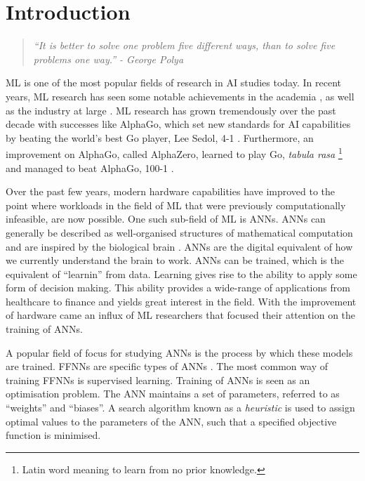 \chapter{Introduction}\label{chap:introduction}

\begin{quotation}
      \textit{``It is better to solve one problem five different ways, than to solve five problems one way.'' - George Polya}
\end{quotation}


\Ac{ML} is one of the most popular fields of research in \ac{AI} studies today.
In recent years, \ac{ML} research has seen some notable achievements in the
academia \cite{ref:lecun:2015, ref:glorot:2010, ref:goodfellow:2014,
      ref:quoc:2017}, as well as the industry at large \cite{ref:silver:2016,
      ref:silver:2017, ref:zoph:2017, ref:lewis:2017}.  \ac{ML} research has grown
tremendously over the past decade with successes like AlphaGo, which set new
standards for \ac{AI} capabilities by beating the world's best Go player, Lee
Sedol, 4-1 \cite{ref:san-hun:2016}.  Furthermore, an improvement on AlphaGo,
called AlphaZero, learned to play Go, \textit{tabula rasa} \footnote{Latin word
      meaning to learn from no prior knowledge.} and managed to beat AlphaGo, 100-1
\cite{ref:silver:2017}.

Over the past few years, modern hardware capabilities have improved to the
point where workloads in the field of \ac{ML} that were previously computationally
infeasible, are now possible. One such sub-field of \ac{ML} is \acp{ANN}. \acp{ANN} can generally be described as well-organised structures of mathematical computation and are inspired by the biological brain \cite{ref:engelbrecht:2007}. \acp{ANN} are the digital equivalent of how we currently understand the brain to work. \acp{ANN} can be trained, which is the equivalent of ``learnin'' from data. Learning gives rise to the ability to apply some form of decision making. This ability provides a wide-range of applications from healthcare to finance and yields great interest in the field. With the improvement of hardware came an influx of \ac{ML} researchers that focused
their attention on the training of \acp{ANN}.

A popular field of focus for studying \acp{ANN} is the process by which
these models are trained. \acp{FFNN} are specific types of
\acp{ANN} \cite{ref:reed:1999}. The most common way of training \acp{FFNN} is
supervised learning. Training of \acp{ANN} is seen as an optimisation problem. The \ac{ANN} maintains a set of parameters, referred to as ``weights'' and ``biases''. A search algorithm known as a \textit{heuristic}
\cite{ref:pearl:1984} is used to assign optimal values to the parameters of the \ac{ANN}, such that a specified objective function is minimised.

